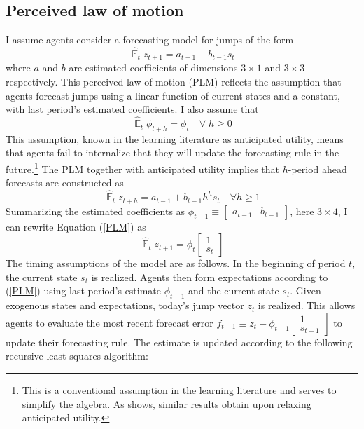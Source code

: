 \documentclass[11pt]{article}
\renewcommand{\[}{\begin{equation}}
\renewcommand{\]}{\end{equation}}
\DeclareMathOperator{\E}{\mathbb{E}}
\begin{document}
\subsection{Perceived law of motion}
I assume agents consider a forecasting model for jumps of the form
\begin{equation}
\hat{\E}_{t}z_{t+1} = a_{t-1} + b_{t-1} s_{t} \label{PLM}  
\end{equation}
where $a$ and $b$ are estimated coefficients of dimensions $3\times1$ and $3\times3$ respectively. This perceived law of motion (PLM) reflects the assumption that agents forecast jumps using a linear function of current states and a constant, with last period's estimated coefficients. I also assume that 
\begin{equation}
\hat{\E}_{t}{\phi_{t+h}} = \phi_{t} \quad \forall \; h\geq0 
\end{equation}
This assumption, known in the learning literature as anticipated utility, means that agents fail to internalize that they will update the forecasting rule in the future.\footnote{This is a conventional assumption in the learning literature and serves to simplify the algebra. As \cite{sargent1999} shows, similar results obtain upon relaxing anticipated utility.} The PLM together with anticipated utility implies that $h$-period ahead forecasts are constructed as
\begin{equation}
\hat{\E}_t z_{t+h} = a_{t-1} + b_{t-1}h^{h}s_t  \quad \forall h\geq 1 \label{PLM_fcst_general}
\end{equation}
Summarizing the estimated coefficients as $\phi_{t-1} \equiv \begin{bmatrix}a_{t-1} & b_{t-1}\end{bmatrix}$, here $3\times 4$, I can rewrite Equation (\ref{PLM}) as 
\begin{equation} 
\hat{\E}_t z_{t+1} = \phi_{t}\begin{bmatrix} 1 \\ s_{t} \end{bmatrix} \label{PLMcompact}
\end{equation}
The timing assumptions of the model are as follows. In the beginning of period $t$, the current state $s_t$ is realized. Agents then form expectations according to (\ref{PLM}) using last period's estimate $\phi_{t-1}$ and the current state $s_t$. Given exogenous states and expectations, today's jump vector $z_t$ is realized. This allows agents to evaluate the most recent forecast error $f_{t-1} \equiv z_t - \phi_{t-1}\begin{bmatrix} 1\\ s_{t-1}\end{bmatrix}$ to update their forecasting rule. The estimate is updated according to the following recursive least-squares algorithm:
\end{document}
